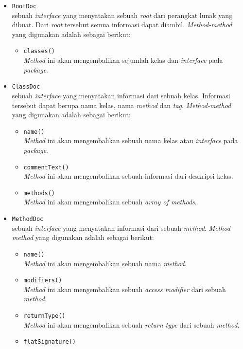 \begin{itemize}
	\item {\tt RootDoc}\\
	sebuah {\it interface} yang menyatakan sebuah {\it root} dari perangkat lunak yang dibuat. Dari {\it root} tersebut semua informasi dapat diambil. {\it Method-method} yang digunakan adalah sebagai berikut:
	\begin{itemize}
		\item {\tt classes()}\\
		{\it Method} ini akan mengembalikan sejumlah kelas dan {\it interface} pada {\it package}.
	\end{itemize}
	\item {\tt ClassDoc}\\
	sebuah {\it interface} yang menyatakan informasi dari sebuah kelas. Informasi tersebut dapat berupa nama kelas, nama {\it method} dan {\it tag}. {\it Method-method} yang digunakan adalah sebagai berikut:
	\begin{itemize}
		\item {\tt name()}\\
		{\it Method} ini akan mengembalikan sebuah nama kelas atau {\it interface} pada {\it package}.
		\item {\tt commentText()}\\
		{\it Method} ini akan mengembalikan sebuah informasi dari deskripsi kelas.
		\item {\tt methods()}\\
		{\it Method} ini akan mengembalikan sebuah {\it array of methods}.
	\end{itemize}
	\item {\tt MethodDoc}\\
	sebuah {\it interface} yang menyatakan informasi dari sebuah {\it method}. {\it Method-method} yang digunakan adalah sebagai berikut:
	\begin{itemize}
		\item {\tt name()}\\
		{\it Method} ini akan mengembalikan sebuah nama {\it method}.
		\item {\tt modifiers()}\\
		{\it Method} ini akan mengembalikan sebuah {\it access modifier} dari sebuah {\it method}.
		\item {\tt returnType()}\\
		{\it Method} ini akan mengembalikan sebuah {\it return type} dari sebuah {\it method}.
		\item {\tt flatSignature()}\\

\end{itemize}
\end{itemize}
